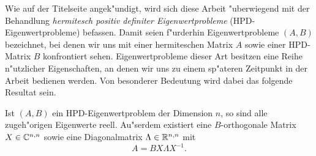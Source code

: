 Wie auf der Titelseite angek"undigt, wird sich diese Arbeit "uberwiegend mit der Behandlung \emph{hermitesch positiv definiter Eigenwertprobleme} (HPD-Eigenwertprobleme) befassen.
Damit seien f"urderhin Eigenwertprobleme $(A,B)$ bezeichnet, bei denen wir uns mit einer hermiteschen Matrix $A$ sowie einer HPD-Matrix $B$ konfrontiert sehen.
Eigenwertprobleme dieser Art besitzen eine Reihe n"utzlicher Eigenschaften, an denen wir uns zu einem sp"ateren Zeitpunkt in der Arbeit bedienen werden.
Von besonderer Bedeutung wird dabei das folgende Resultat sein.

\begin{thm}\label{thm:chap2:realEigenvalues}
Ist $(A,B)$ ein HPD-Eigenwertproblem der Dimension $n$, so sind alle zugeh"origen Eigenwerte reell.
Au"serdem existiert eine $B$-orthogonale Matrix $X\in\mathbb{C}^{n,n}$ sowie eine Diagonalmatrix $\Lambda\in\mathbb{R}^{n,n}$ mit
\begin{equation}\label{eq:chap2:evpMatrix}
A = BX\Lambda X^{-1}.
\end{equation}
\end{thm}

